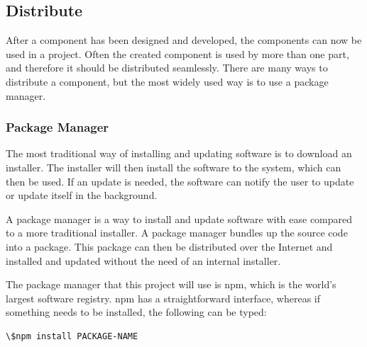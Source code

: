 





\subsection{Distribute}%
\label{sub:Distribute}
After a \gls{component} has been designed and developed, the \glspl{component} can now be used in a project. Often the created \gls{component} is used by more than one part, and therefore it should be distributed seamlessly. There are many ways to distribute a \gls{component}, but the most widely used way is to use a package manager.


\subsubsection{Package Manager}%
\label{sub:Package Manager}

The most traditional way of installing and updating software is to download an installer. The installer will then install the software to the system, which can then be used. If an update is needed, the software can notify the user to update or update itself in the background.

A package manager is a way to install and update software with ease compared to a more traditional installer. A package manager bundles up the source code into a package. This package can then be distributed over the Internet and installed and updated without the need of an internal installer. 

The package manager that this project will use is \acrfull{npm}, which is the world's largest software registry\cite{NpmNpmDocs}.
\acrshort{npm} has a straightforward interface, whereas if something needs to be installed, the following can be typed: 


\begin{lstlisting}[style=htmlcssjs]
\$npm install PACKAGE-NAME
\end{lstlisting}

